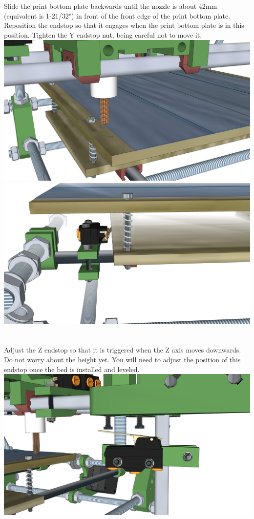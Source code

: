 \documentclass[twoside,openany,a4paper,titlepage]{memoir}
\begin{document}
	\section{}
	Slide the print bottom plate backwards until the nozzle is about 42mm (equivalent is 1-21/32") in front of
	the front edge of the print bottom plate. Reposition the endstop so that it engages when the print bottom
	plate is in this position. Tighten the Y endstop nut, being careful not to move it.\\
	\includegraphics[width=1\linewidth]{graphics/ch10_8_1.png}
	\includegraphics[width=1\linewidth]{graphics/ch10_8_2.png}
	
	\section{}
	Adjust the Z endstop so that it is triggered when the Z axis moves downwards. Do not worry about the
	height yet. You will need to adjust the position of this endstop once the bed is installed and leveled.\\
	\includegraphics[width=1\linewidth]{graphics/ch10_9.png}
	
\end{document}

